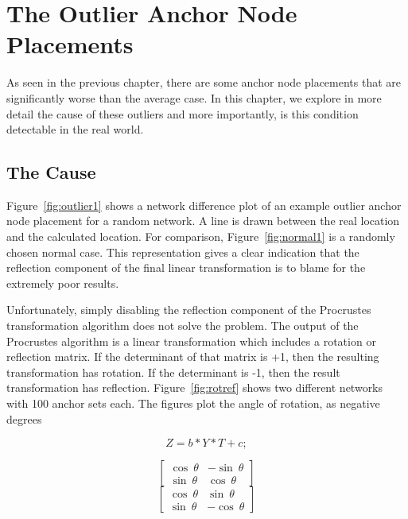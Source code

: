 \chapter{The Outlier Anchor Node Placements}
As seen in the previous chapter, there are some anchor node placements that are significantly worse than the average case.   In this chapter, we explore in more detail the cause of these outliers and more importantly, is this condition detectable in the real world.

\section{The Cause}
Figure~\ref{fig:outlier1} shows a network difference plot of an example outlier anchor node placement for a random network. A line is drawn between the real location and the calculated location.  For comparison, Figure~\ref{fig:normal1} is a randomly chosen normal case. This representation gives a clear indication that the reflection component of the final linear transformation is to blame for the extremely poor results.  

\begin{figure}
  \centering
	\label{}
	\caption{}
\end{figure}

Unfortunately, simply disabling the reflection component of the Procrustes transformation algorithm does not solve the problem.  The output of the Procrustes algorithm is a linear transformation which includes a rotation or reflection matrix.  If the determinant of that matrix is +1, then the resulting transformation has rotation.  If the determinant is -1, then the result transformation has reflection. Figure~\ref{fig:rotref} shows two different networks with 100 anchor sets each.  The figures plot the angle of rotation, as negative degrees

\begin{equation}
Z = b*Y*T + c;
\end{equation}

\begin{equation}
	\begin{bmatrix}
	\cos~\theta & -\sin~\theta \\ 
	\sin~\theta & \cos~\theta \end{bmatrix}
	\label{eqn:rotmatrix} 
\end{equation}
\begin{equation}
	\begin{bmatrix}
	\cos~\theta & \sin~\theta \\ 
	\sin~\theta & -\cos~\theta \end{bmatrix}
	\label{eqn:refmatrix} 
\end{equation}

